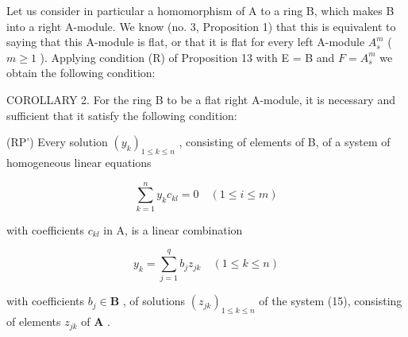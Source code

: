 Let us consider in particular a homomorphism of A to a ring B, which makes B into a right A-module. We know (no. 3, Proposition 1) that this is equivalent to saying that this A-module is flat, or that it is flat for every left A-module \(A_{s}^{m}\) ( \(m \geqslant 1\) ). Applying condition (R) of Proposition 13 with E = B and \(F = A_{s}^{m}\) we obtain the following condition:

COROLLARY 2. For the ring B to be a flat right A-module, it is necessary and sufficient that it satisfy the following condition:

(RP') Every solution \((y_{k})_{1\leqslant k\leqslant n}\) , consisting of elements of B, of a system of homogeneous linear equations

\[
\sum_ {k = 1} ^ {n} y _ {k} c _ {k l} = 0 \quad (1 \leqslant i \leqslant m)\tag{15}
\]

with coefficients \(c_{kl}\) in A, is a linear combination

\[
y _ {k} = \sum_ {j = 1} ^ {q} b _ {j} z _ {j k} \quad (1 \leqslant k \leqslant n)\tag{16}
\]

with coefficients \(b_{j} \in \mathbf{B}\) , of solutions \((z_{jk})_{1 \leqslant k \leqslant n}\) of the system (15), consisting of elements \(z_{jk}\) of \(\mathbf{A}\) .

